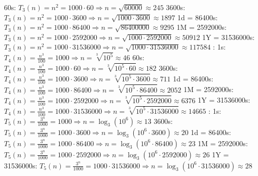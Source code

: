 \documentclass{article}
\begin{document}
\begin{flushleft}
\newline
60s: $T_3(n) = n^2 = 1000 \cdot 60 \Longrightarrow n = \sqrt{60000} \approx 245$
\newline
3600s: $T_3(n) = n^2 = 1000 \cdot 3600 \Longrightarrow n = \sqrt{1000 \cdot 3600} \approx 1897$
\newline
1d = 86400s: $T_3(n) = n^2 = 1000 \cdot 86400 \Longrightarrow n = \sqrt{86400000} \approx 9295$
\newline
1M = 2592000s: $T_3(n) = n^2 = 1000 \cdot 2592000 \Longrightarrow n = \sqrt{1000 \cdot 2592000} \approx 50912$
\newline
1Y = 31536000s: $T_3(n) = n^2 = 1000 \cdot 31536000 \Longrightarrow n = \sqrt{1000 \cdot 31536000} \approx 117584$ 
\newline
{}:
\newline
1s: $T_4(n) = \frac{n^3}{100} = 1000 \Longrightarrow n = \sqrt[3]{10^5} \approx 46$
\newline
60s: $T_4(n) = \frac{n^3}{100} = 1000 \cdot 60 \Longrightarrow n = \sqrt[3]{10^5 \cdot 60} \approx 182$
\newline
3600s: $T_4(n) = \frac{n^3}{100} = 1000 \cdot 3600 \Longrightarrow n = \sqrt[3]{10^5 \cdot 3600} \approx 711$
\newline
1d = 86400s: $T_4(n) = \frac{n^3}{100} = 1000 \cdot 86400 \Longrightarrow n = \sqrt[3]{10^5 \cdot 86400} \approx 2052$
\newline
1M = 2592000s: $T_4(n) = \frac{n^3}{100} = 1000 \cdot 2592000 \Longrightarrow n = \sqrt[3]{10^5 \cdot 2592000} \approx 6376$
\newline
1Y = 31536000s: $T_4(n) = \frac{n^3}{100} = 1000 \cdot 31536000 \Longrightarrow n = \sqrt[3]{10^5 \cdot 31536000} \approx 14665$
\newline
{}:
\newline
1s: $T_5(n) = \frac{3^n}{1000} = 1000 \Longrightarrow n = \log_3(10^6) \approx 13$
\newline
3600s: $T_5(n) = \frac{3^n}{1000} = 1000 \cdot 3600 \Longrightarrow n = \log_3(10^6 \cdot 3600) \approx 20$
\newline
1d = 86400s: $T_5(n) = \frac{3^n}{1000} = 1000 \cdot 86400 \Longrightarrow n = \log_3(10^6 \cdot 86400) \approx 23$
\newline
1M = 2592000s: $T_5(n) = \frac{3^n}{1000} = 1000 \cdot 2592000 \Longrightarrow n = \log_3(10^6 \cdot 2592000) \approx 26$
\newline
1Y = 31536000s: $T_5(n) = \frac{3^n}{1000} = 1000 \cdot 31536000 \Longrightarrow n = \log_3(10^6 \cdot 31536000) \approx 28$

\end{flushleft}
\end{document}
